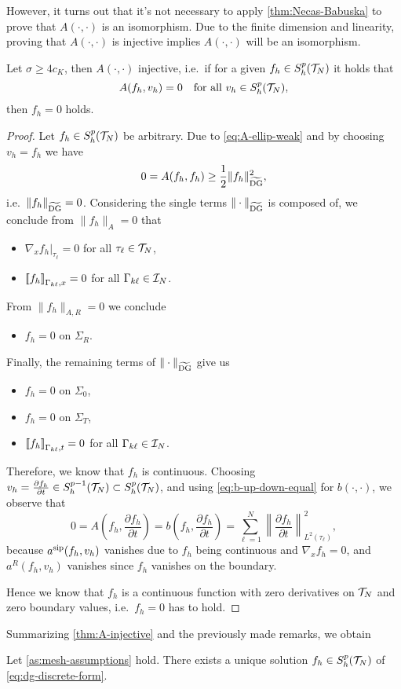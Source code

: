 \documentclass[../thesis.tex]{subfiles}
\begin{document}
However, it turns out that it's not necessary to apply \cref{thm:Necas-Babuska} to prove that $A(\cdot, \cdot)$ is an isomorphism. Due to the finite dimension and linearity, proving that $A(\cdot, \cdot)$ is injective implies $A(\cdot, \cdot)$ will be an isomorphism.
\begin{lemma}
\label{thm:A-injective}
Let $\sigma \geq 4 c_K$, then $A(\cdot, \cdot)$ injective, i.e.\ if for a given $f_h \in S_h^p(\mathcal{T}_N)$ it holds that
\[
	A(f_h, v_h) = 0 \quad \text{for all } v_h \in S_h^p(\mathcal{T}_N),
\]
then $f_h = 0$ holds.
\end{lemma}
\begin{proof}
Let $f_h \in S_h^p(\mathcal{T}_N)$ be arbitrary.
Due to \cref{eq:A-ellip-weak} and by choosing $v_h = f_h$ we have
\[
	0 = A(f_h, f_h) \geq \frac{1}{2} \| f_h \|_{\widetilde{\mathrm{DG}}}^2,
\]
i.e.\ $\| f_h \|_{\widetilde{\mathrm{DG}}} = 0$. Considering the single terms $\| \cdot \|_{\widetilde{\mathrm{DG}}}$ is composed of, we conclude from $\| f_h \|_A = 0$ that
\begin{itemize}
	\item $\nabla_x f_h |_{\tau_\ell} = 0$ for all $\tau_\ell \in \mathcal{T}_N$,
	\item ${\lbrack\!\lbrack} f_h {\rbrack\!\rbrack}_{\Gamma_{k\ell}, x} = 0$ for all $\Gamma_{k\ell} \in \mathcal{I}_N$.
\end{itemize}
From $\| f_h \|_{A, R} = 0$ we conclude
\begin{itemize}
	\item $f_h = 0$ on $\Sigma_R$.
\end{itemize}
Finally, the remaining terms of $\| \cdot \|_{\widetilde{\mathrm{DG}}}$ give us
\begin{itemize}
	\item $f_h = 0$ on $\Sigma_0$,
	\item $f_h = 0$ on $\Sigma_T$,
	\item ${\lbrack\!\lbrack} f_h {\rbrack\!\rbrack}_{\Gamma_{k\ell}, t} = 0$ for all $\Gamma_{k\ell} \in \mathcal{I}_N$.
\end{itemize}
Therefore, we know that $f_h$ is continuous. Choosing $v_h = \frac{\partial f_h}{\partial t} \in S_h^{p-1}(\mathcal{T}_N) \subset S_h^p(\mathcal{T}_N)$, and using \cref{eq:b-up-down-equal} for $b(\cdot, \cdot)$, we observe that
\[
	0 = A \left(f_h, \frac{\partial f_h}{\partial t}\right) = b\left(f_h,  \frac{\partial f_h}{\partial t}\right) = \sum_{\ell=1}^N \left\| \frac{\partial f_h}{\partial t} \right\|_{L^2(\tau_\ell)}^2,
\]
because $a^{\mathrm{sip}}(f_h, v_h)$ vanishes due to $f_h$ being continuous and $\nabla_x f_h = 0$, and $a^R(f_h, v_h)$ vanishes since $f_h$ vanishes on the boundary.

Hence we know that $f_h$ is a continuous function with zero derivatives on $\mathcal{T}_N$ and zero boundary values, i.e.\ $f_h = 0$ has to hold.  
\end{proof}
Summarizing \cref{thm:A-injective} and the previously made remarks, we obtain
\begin{theorem}
Let \cref{as:mesh-assumptions} hold. There exists a unique solution $f_h \in S_h^p(\mathcal{T}_N)$ of \cref{eq:dg-discrete-form}.
\end{theorem}
\end{document}

